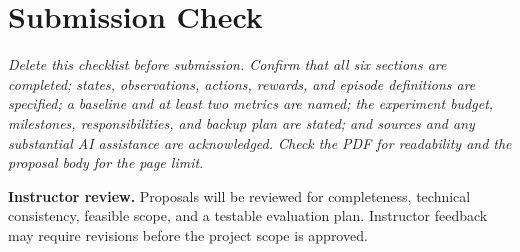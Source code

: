 \documentclass[11pt,letterpaper]{article}
\newcommand{\prompt}[1]{{\itshape #1}}
\begin{document}
\section*{Submission Check}
\prompt{Delete this checklist before submission. Confirm that all six sections
are completed; states, observations, actions, rewards, and episode definitions are
specified; a baseline and at least two metrics are named; the experiment budget,
milestones, responsibilities, and backup plan are stated; and sources and any
substantial AI assistance are acknowledged. Check the PDF for readability and
the proposal body for the page limit.}

\textbf{Instructor review.} Proposals will be reviewed for completeness,
technical consistency, feasible scope, and a testable evaluation plan.
Instructor feedback may require revisions before the project scope is approved.
\end{document}
